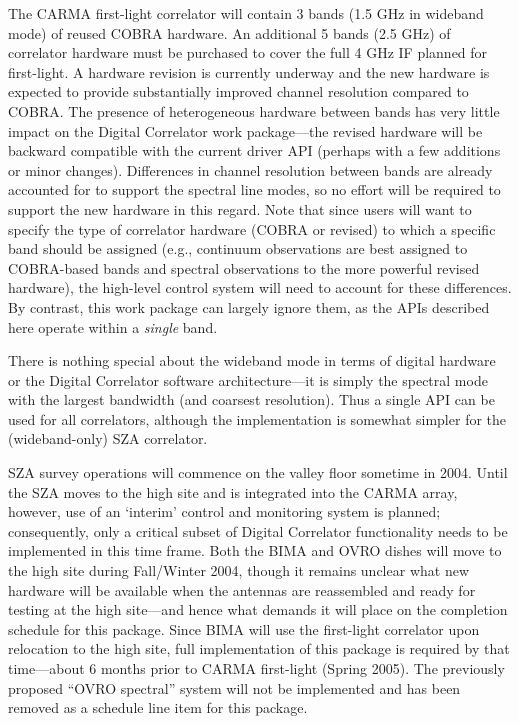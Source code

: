 \documentclass[11pt]{article}
\begin{document}
The CARMA
first-light correlator will contain 3 bands (1.5 GHz in wideband mode) of
reused COBRA hardware. An additional 5 bands (2.5 GHz) of correlator hardware
must be purchased to cover the full 4 GHz IF planned for first-light. A
hardware revision is currently underway and the new hardware is expected to
provide substantially improved channel resolution compared to COBRA. The
presence of heterogeneous hardware between bands has very little impact on
the Digital Correlator work package---the revised hardware will be backward
compatible with the current driver API (perhaps with a few additions or minor
changes). Differences in channel resolution between bands are already 
accounted for to support the spectral line modes, so no effort will be 
required to support the new hardware in this regard. Note that since users
will want to specify the type of correlator hardware (COBRA or revised) to 
which a specific band should be assigned (e.g., continuum observations are 
best assigned to COBRA-based bands and spectral observations to the 
more powerful revised hardware), the high-level control system will need to 
account for these differences. By contrast, this work package can largely
ignore them, as the APIs described here operate within a {\it single}
band.

There is nothing special about the wideband mode in terms of digital hardware
or the Digital Correlator software architecture---it is simply the spectral
mode with the largest bandwidth (and coarsest resolution).
Thus a single API can be used for all
correlators, although the implementation is somewhat simpler for the
(wideband-only) SZA correlator.

SZA survey operations will commence on the valley floor sometime in 2004. 
Until the SZA moves to the high site and is integrated into the CARMA array, 
however, use of an `interim' control and monitoring
system is planned; consequently, only a critical subset of Digital Correlator
functionality needs to be implemented in this time frame.
Both the BIMA and OVRO dishes will move
to the high site during Fall/Winter 2004, though it remains
unclear what new hardware will be available when the antennas are reassembled
and ready for testing at the high site---and hence what demands it will place 
on the completion schedule for this package.
Since BIMA will use
the first-light correlator upon relocation to the high site, full
implementation of this package is required by that time---about 6 months prior
to CARMA first-light (Spring 2005).
The previously proposed ``OVRO spectral'' system will not be implemented and
has been removed as a schedule line item for this package.
\end{document}
